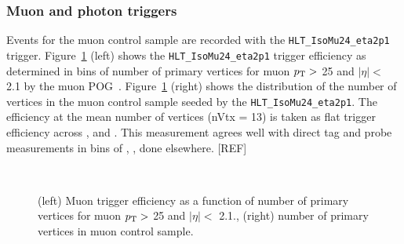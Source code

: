 \subsubsection{Muon and photon triggers\label{sec:muon_triggers}}

Events for the muon control sample are recorded with the \verb!HLT_IsoMu24_eta2p1! 
trigger. Figure~\ref{fig:eff-muon} (left) shows the \verb!HLT_IsoMu24_eta2p1! 
trigger efficiency as determined in bins of number of primary vertices 
for muon $p_{\mathrm{T}} >$ 25 \gev and $|\eta| <$ 2.1 by the muon POG~\cite{ref:muon-eff}.
Figure~\ref{fig:eff-muon} (right) shows the distribution of the number 
of vertices in the muon control sample seeded by the \verb!HLT_IsoMu24_eta2p1!. 
The efficiency at the mean number of vertices (nVtx = 13) is taken as flat
trigger efficiency across \njet, \nb and \scalht. This measurement 
agrees well with direct tag and probe measurements in bins of 
\njet, \nb, \scalht done elsewhere. [REF]

\begin{figure}[!h]
  \begin{center}
  \\     
    \caption{\label{fig:eff-muon}
    (left) Muon trigger efficiency as a function of
    number of primary vertices for muon $p_{\mathrm{T}}>$ 25 \gev and
    $|\eta| <$ 2.1., (right) number of primary vertices
    in muon control sample.} 
 
  \end{center}
\end{figure}

